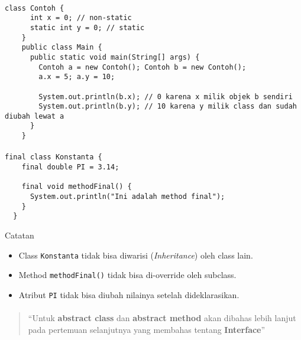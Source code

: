 \documentclass{../praktikum-ppt}
\begin{document}
    \begin{frame}[fragile]{\insertsection}
      \framesubtitle{\insertsubsection}
      \begin{lstlisting}[caption={Penggunaan \texttt{static} untuk atribut}]
    class Contoh {
      int x = 0; // non-static
      static int y = 0; // static
    }
    public class Main {
      public static void main(String[] args) {
        Contoh a = new Contoh(); Contoh b = new Contoh();
        a.x = 5; a.y = 10;

        System.out.println(b.x); // 0 karena x milik objek b sendiri
        System.out.println(b.y); // 10 karena y milik class dan sudah diubah lewat a
      }
    }
      \end{lstlisting}
    \end{frame}

    \begin{frame}[fragile]{\insertsection}
      \framesubtitle{\insertsubsection}
      \begin{lstlisting}[caption={Penggunaan \texttt{final}}]
  final class Konstanta {
    final double PI = 3.14;

    final void methodFinal() {
      System.out.println("Ini adalah method final");
    }
  }
      \end{lstlisting}

      \begin{alertblock}{Catatan}
        \begin{itemize}
        \item Class \texttt{Konstanta} tidak bisa diwarisi (\textit{Inheritance}) oleh class lain.
        \item Method \texttt{methodFinal()} tidak bisa di-override oleh subclass.
        \item Atribut \texttt{PI} tidak bisa diubah nilainya setelah dideklarasikan.
      \end{itemize}
      \end{alertblock}
    \end{frame}

    \begin{frame}{\insertsection}
      \framesubtitle{\insertsubsection}
      \begin{quote}
        ``Untuk \textbf{abstract class} dan \textbf{abstract method} akan dibahas lebih lanjut pada pertemuan selanjutnya yang membahas tentang \textbf{Interface}''
      \end{quote}
    \end{frame}
\end{document}
